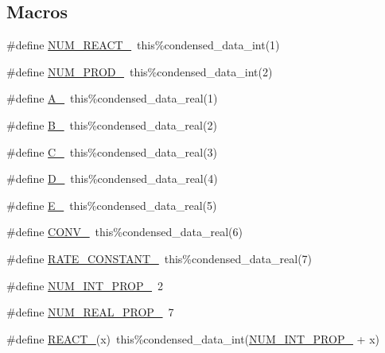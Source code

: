 \subsection*{Macros}
\begin{DoxyCompactItemize}
\item 
\#define \mbox{\hyperlink{rxn__arrhenius_8_f90_a05ef845cf6ed7ab9a774440c42af34fa}{N\+U\+M\+\_\+\+R\+E\+A\+C\+T\+\_\+}}~this\%condensed\+\_\+data\+\_\+int(1)
\item 
\#define \mbox{\hyperlink{rxn__arrhenius_8_f90_acf951e890da75cd2d503ed6ce8211fc2}{N\+U\+M\+\_\+\+P\+R\+O\+D\+\_\+}}~this\%condensed\+\_\+data\+\_\+int(2)
\item 
\#define \mbox{\hyperlink{rxn__arrhenius_8_f90_a71700f5633db3f99b43c798b09c60bd2}{A\+\_\+}}~this\%condensed\+\_\+data\+\_\+real(1)
\item 
\#define \mbox{\hyperlink{rxn__arrhenius_8_f90_a97097eeee58a37a9710a05f559d84a6b}{B\+\_\+}}~this\%condensed\+\_\+data\+\_\+real(2)
\item 
\#define \mbox{\hyperlink{rxn__arrhenius_8_f90_ad010fec48ee67af5ba75e0ec6c3f5ce4}{C\+\_\+}}~this\%condensed\+\_\+data\+\_\+real(3)
\item 
\#define \mbox{\hyperlink{rxn__arrhenius_8_f90_abf33a03f27734aa2fcf6119f36390bd9}{D\+\_\+}}~this\%condensed\+\_\+data\+\_\+real(4)
\item 
\#define \mbox{\hyperlink{rxn__arrhenius_8_f90_a80ef7c0a31f0dd1900c1d9b0bd3b96cc}{E\+\_\+}}~this\%condensed\+\_\+data\+\_\+real(5)
\item 
\#define \mbox{\hyperlink{rxn__arrhenius_8_f90_a91cd74713029c0906e8136c8628d548d}{C\+O\+N\+V\+\_\+}}~this\%condensed\+\_\+data\+\_\+real(6)
\item 
\#define \mbox{\hyperlink{rxn__arrhenius_8_f90_a6d62af2f44a112ef5b324cf406a830c2}{R\+A\+T\+E\+\_\+\+C\+O\+N\+S\+T\+A\+N\+T\+\_\+}}~this\%condensed\+\_\+data\+\_\+real(7)
\item 
\#define \mbox{\hyperlink{rxn__arrhenius_8_f90_a13ba1b28e3d8a5e60eec52ce6bbabe4f}{N\+U\+M\+\_\+\+I\+N\+T\+\_\+\+P\+R\+O\+P\+\_\+}}~2
\item 
\#define \mbox{\hyperlink{rxn__arrhenius_8_f90_aa9808eb54fa06bcf890dd1aa1fc6ca5b}{N\+U\+M\+\_\+\+R\+E\+A\+L\+\_\+\+P\+R\+O\+P\+\_\+}}~7
\item 
\#define \mbox{\hyperlink{rxn__arrhenius_8_f90_ae761e39657aac155d83eae9b338be571}{R\+E\+A\+C\+T\+\_\+}}(x)~this\%condensed\+\_\+data\+\_\+int(\mbox{\hyperlink{rxn__arrhenius_8_f90_a13ba1b28e3d8a5e60eec52ce6bbabe4f}{N\+U\+M\+\_\+\+I\+N\+T\+\_\+\+P\+R\+O\+P\+\_\+}} + x)

\end{DoxyCompactItemize}

